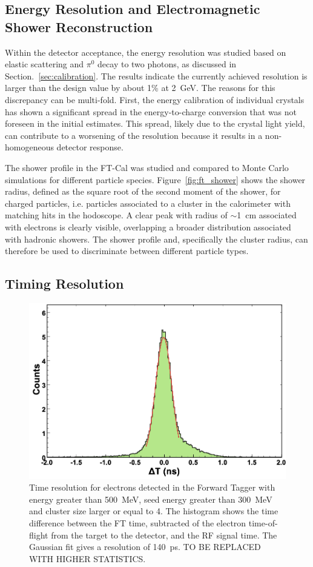 \subsection{Energy Resolution and Electromagnetic Shower Reconstruction}

Within the detector acceptance, the energy resolution was studied based on elastic scattering and $\pi^0$ decay to
two photons, as discussed in Section.~\ref{sec:calibration}. The results indicate the currently achieved resolution is
larger than the design value by about 1\% at 2~GeV. The reasons for this discrepancy can be multi-fold. First, the
energy calibration of individual crystals has shown a significant spread in the energy-to-charge conversion that was
not foreseen in the initial estimates. This spread, likely due to the crystal light yield, can contribute to a worsening
of the resolution because it results in a non-homogeneous detector response. 

The shower profile in the FT-Cal was studied and compared to Monte Carlo simulations for different particle
species. Figure~\ref{fig:ft_shower} shows the shower radius, defined as the square root of the second moment of
the shower, for charged particles, i.e. particles associated to a cluster in the calorimeter with matching hits in the
hodoscope. A clear peak with radius of $\sim$1~cm associated with electrons is clearly visible, overlapping a
broader distribution associated with hadronic showers. The shower profile and, specifically the cluster radius, can
therefore be used to discriminate between different particle types.

\subsection{Timing Resolution}

\begin{figure}[h]
\includegraphics[height=0.6\columnwidth]{fig/ft_electron_time.png}
\caption{Time resolution for electrons detected in the Forward Tagger with energy greater than 500~MeV, seed
  energy greater than 300~MeV and cluster size larger or equal to 4. The histogram shows the time difference
  between the FT time, subtracted of the electron time-of-flight from the target to the detector, and the RF signal
  time. The Gaussian fit gives a resolution of 140~ps. TO BE REPLACED WITH HIGHER STATISTICS.}
\label{fig:electron_time}
\end{figure}

